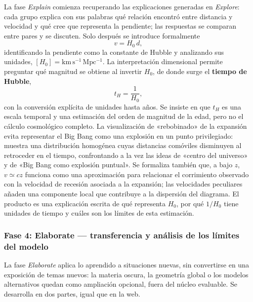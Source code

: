 La fase \textit{Explain} comienza recuperando las explicaciones generadas en \textit{Explore}: cada grupo explica con sus palabras qué relación encontró entre distancia y velocidad y qué cree que representa la pendiente; las respuestas se comparan entre pares y se discuten. Solo después se introduce formalmente
\begin{equation}
v=H_0\,d,
\end{equation}
identificando la pendiente como la constante de Hubble y analizando sus unidades, $[H_0]=\mathrm{km\,s^{-1}\,Mpc^{-1}}$. La interpretación dimensional permite preguntar qué magnitud se obtiene al invertir $H_0$, de donde surge el \textbf{tiempo de Hubble},
\begin{equation}
t_H=\frac{1}{H_0},
\end{equation}
con la conversión explícita de unidades hasta años. Se insiste en que $t_H$ es una escala temporal y una estimación del orden de magnitud de la edad, pero no el cálculo cosmológico completo. La visualización de «rebobinado» de la expansión evita representar el Big Bang como una explosión en un punto privilegiado: muestra una distribución homogénea cuyas distancias comóviles disminuyen al retroceder en el tiempo, confrontando a la vez las ideas de «centro del universo» y de «Big Bang como explosión puntual». Se formaliza también que, a bajo $z$, $v\simeq cz$ funciona como una aproximación para relacionar el corrimiento observado con la velocidad de recesión asociada a la expansión; las velocidades peculiares añaden una componente local que contribuye a la dispersión del diagrama. El producto es una explicación escrita de qué representa $H_0$, por qué $1/H_0$ tiene unidades de tiempo y cuáles son los límites de esta estimación.

\subsubsection{Fase 4: Elaborate --- transferencia y análisis de los límites del modelo}\label{sec:elaborate}

La fase \textit{Elaborate} aplica lo aprendido a situaciones nuevas, sin convertirse en una exposición de temas nuevos: la materia oscura, la geometría global o los modelos alternativos quedan como ampliación opcional, fuera del núcleo evaluable. Se desarrolla en dos partes, igual que en la web.

